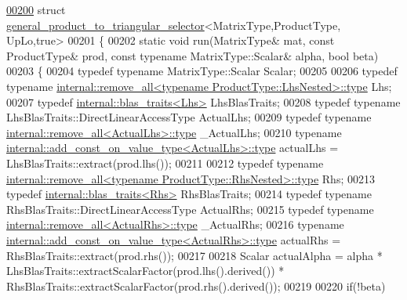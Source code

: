 \begin{DoxyCode}
\hyperlink{struct_eigen_1_1general__product__to__triangular__selector_3_01_matrix_type_00_01_product_type_00_01_up_lo_00_01true_01_4}{00200} \textcolor{keyword}{struct }\hyperlink{struct_eigen_1_1general__product__to__triangular__selector}{general\_product\_to\_triangular\_selector}<MatrixType,ProductType,
      UpLo,true>
00201 \{
00202   \textcolor{keyword}{static} \textcolor{keywordtype}{void} run(MatrixType& mat, \textcolor{keyword}{const} ProductType& prod, \textcolor{keyword}{const} \textcolor{keyword}{typename} MatrixType::Scalar& alpha, \textcolor{keywordtype}{bool} 
      beta)
00203   \{
00204     \textcolor{keyword}{typedef} \textcolor{keyword}{typename} MatrixType::Scalar Scalar;
00205     
00206     \textcolor{keyword}{typedef} \textcolor{keyword}{typename} \hyperlink{group___sparse_core___module}{internal::remove\_all<typename ProductType::LhsNested>::type}
       Lhs;
00207     \textcolor{keyword}{typedef} \hyperlink{struct_eigen_1_1internal_1_1blas__traits}{internal::blas\_traits<Lhs>} LhsBlasTraits;
00208     \textcolor{keyword}{typedef} \textcolor{keyword}{typename} LhsBlasTraits::DirectLinearAccessType ActualLhs;
00209     \textcolor{keyword}{typedef} \textcolor{keyword}{typename} \hyperlink{group___sparse_core___module}{internal::remove\_all<ActualLhs>::type} \_ActualLhs;
00210     \textcolor{keyword}{typename} \hyperlink{group___sparse_core___module}{internal::add\_const\_on\_value\_type<ActualLhs>::type}
       actualLhs = LhsBlasTraits::extract(prod.lhs());
00211     
00212     \textcolor{keyword}{typedef} \textcolor{keyword}{typename} \hyperlink{group___sparse_core___module}{internal::remove\_all<typename ProductType::RhsNested>::type}
       Rhs;
00213     \textcolor{keyword}{typedef} \hyperlink{struct_eigen_1_1internal_1_1blas__traits}{internal::blas\_traits<Rhs>} RhsBlasTraits;
00214     \textcolor{keyword}{typedef} \textcolor{keyword}{typename} RhsBlasTraits::DirectLinearAccessType ActualRhs;
00215     \textcolor{keyword}{typedef} \textcolor{keyword}{typename} \hyperlink{group___sparse_core___module}{internal::remove\_all<ActualRhs>::type} \_ActualRhs;
00216     \textcolor{keyword}{typename} \hyperlink{group___sparse_core___module}{internal::add\_const\_on\_value\_type<ActualRhs>::type}
       actualRhs = RhsBlasTraits::extract(prod.rhs());
00217 
00218     Scalar actualAlpha = alpha * LhsBlasTraits::extractScalarFactor(prod.lhs().derived()) * 
      RhsBlasTraits::extractScalarFactor(prod.rhs().derived());
00219 
00220     \textcolor{keywordflow}{if}(!beta)

\end{DoxyCode}
